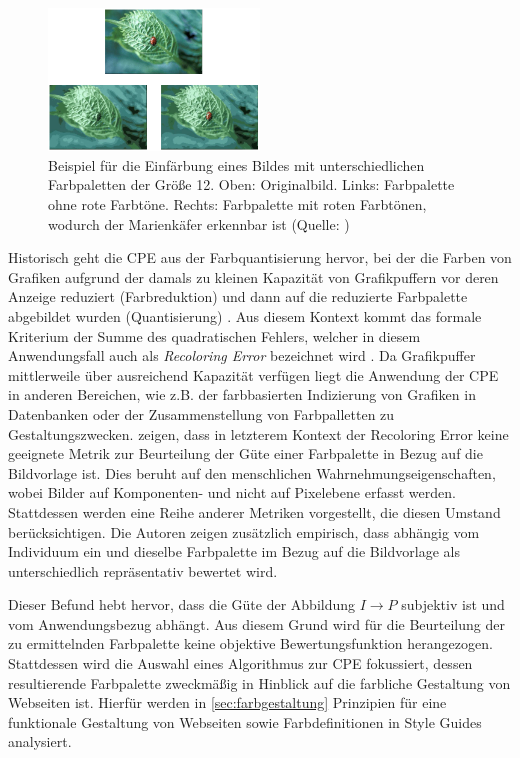 \documentclass[11pt, bibliography=totoc]{scrartcl}
\begin{document}
\begin{figure}[h]
\centering
\includegraphics[width=0.5\textwidth]{img/ladybug.png}
\caption{Beispiel für die Einfärbung eines Bildes mit unterschiedlichen Farbpaletten der Größe 12. Oben: Originalbild. Links: Farbpalette ohne rote Farbtöne. Rechts: Farbpalette mit roten Farbtönen, wodurch der Marienkäfer erkennbar ist (Quelle: \citep{acopa})}
\label{fig:ladybug}
\end{figure}

Historisch geht die CPE aus der Farbquantisierung hervor, bei der die Farben von Grafiken aufgrund der damals zu kleinen Kapazität von Grafikpuffern vor deren Anzeige reduziert (Farbreduktion) und dann auf die reduzierte Farbpalette abgebildet wurden (Quantisierung) \citep{variance}. Aus diesem Kontext kommt das formale Kriterium der Summe des quadratischen Fehlers, welcher in diesem Anwendungsfall auch als \emph{Recoloring Error} bezeichnet wird \citep{colorthemes}. Da Grafikpuffer mittlerweile über ausreichend Kapazität verfügen liegt die Anwendung der CPE in anderen Bereichen, wie z.B. der farbbasierten Indizierung von Grafiken in Datenbanken oder der Zusammenstellung von Farbpalletten zu Gestaltungszwecken. \citet{colorthemes} zeigen, dass in letzterem Kontext der Recoloring Error keine geeignete Metrik zur Beurteilung der Güte einer Farbpalette in Bezug auf die Bildvorlage ist. Dies beruht auf den menschlichen Wahrnehmungseigenschaften, wobei Bilder auf Komponenten- und nicht auf Pixelebene erfasst werden. Stattdessen werden eine Reihe anderer Metriken vorgestellt, die diesen Umstand berücksichtigen. Die Autoren zeigen zusätzlich empirisch, dass abhängig vom Individuum ein und dieselbe Farbpalette im Bezug auf die Bildvorlage als unterschiedlich repräsentativ bewertet wird.

Dieser Befund hebt hervor, dass die Güte der Abbildung $I \to P$ subjektiv ist und vom Anwendungsbezug abhängt. Aus diesem Grund wird für die Beurteilung der zu ermittelnden Farbpalette keine objektive Bewertungsfunktion herangezogen. Stattdessen wird die Auswahl eines Algorithmus zur CPE fokussiert, dessen resultierende Farbpalette zweckmäßig in Hinblick auf die farbliche Gestaltung von Webseiten ist. Hierfür werden in \autoref{sec:farbgestaltung} Prinzipien für eine funktionale Gestaltung von Webseiten sowie Farbdefinitionen in Style Guides analysiert.
\end{document}
